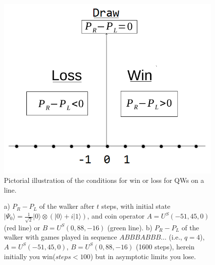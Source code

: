 \documentclass[english,aps,pra,amsmath,amssymb,showpacs,notitlepage,onecolumn]{revtex4-1}
\begin{document}
\begin{figure}[t]
\centering
\includegraphics[scale =0.5]{winloss.png}
\caption{Pictorial illustration of the conditions for win or loss for QWs on a line.}
\label{fig:win-loss}
\end{figure}
\begin{figure}[h]
  \centering {}
  \centering {}
\caption{
 a) $P_{R}-P_{L}$ of the walker  after $t$ steps, with initial state $\vert\Psi_{0}\rangle=\frac{1}{\sqrt{2}}\vert 0\rangle\otimes(\vert 0\rangle+i\vert 1\rangle)$, and coin operator $A=U^{S}(-51,45,0)$ (red line) or $B=U^{S}(0,88,-16)$ (green line).  b) $P_{R}-P_{L}$ of the walker with games played in sequence $ABBBABBB\ldots$ (i.e., $q=4$), $A=U^{S}(-51,45,0)$, $B=U^{S}(0,88,-16)$ (1600 steps), herein initially you win($steps < 100$) but in asymptotic limits you lose.
}\label{game}
\end{figure}
\end{document}
